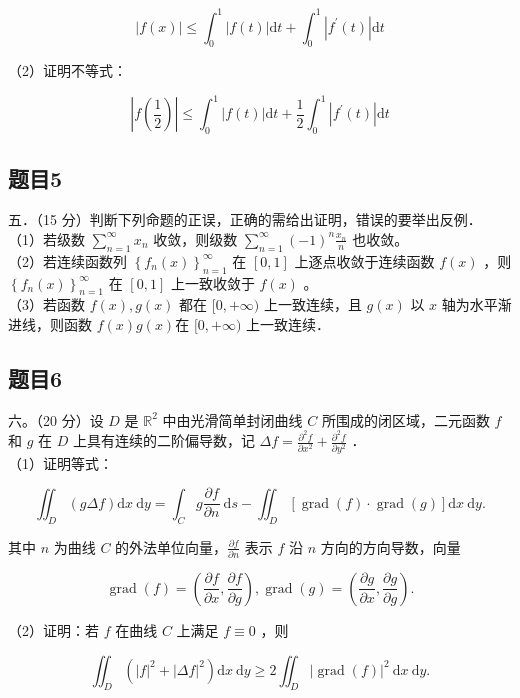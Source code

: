\documentclass{article}
\begin{document}
\[
|f(x)| \leq \int_{0}^{1}|f(t)| \mathrm{d} t+\int_{0}^{1}\left|f^{\prime}(t)\right| \mathrm{d} t
\]

（2）证明不等式：

\[
\left|f\left(\frac{1}{2}\right)\right| \leq \int_{0}^{1}|f(t)| \mathrm{d} t+\frac{1}{2} \int_{0}^{1}\left|f^{\prime}(t)\right| \mathrm{d} t
\]

\subsection{题目5}
五．（15 分）判断下列命题的正误，正确的需给出证明，错误的要举出反例．\\
（1）若级数 \(\sum_{n=1}^{\infty} x_{n}\) 收敛，则级数 \(\sum_{n=1}^{\infty}(-1)^{n} \frac{x_{n}}{n}\) 也收敛。\\
（2）若连续函数列 \(\left\{f_{n}(x)\right\}_{n=1}^{\infty}\) 在 \([0,1]\) 上逐点收敛于连续函数 \(f(x)\) ，则 \(\left\{f_{n}(x)\right\}_{n=1}^{\infty}\) 在 \([0,1]\) 上一致收敛于 \(f(x)\) 。\\
（3）若函数 \(f(x), g(x)\) 都在 \([0,+\infty)\) 上一致连续，且 \(g(x)\) 以 \(x\) 轴为水平渐进线，则函数 \(f(x) g(x)\)在 \([0,+\infty)\) 上一致连续．

\subsection{题目6}
六。（20 分）设 \(D\) 是 \(\mathbb{R}^{2}\) 中由光滑简单封闭曲线 \(C\) 所围成的闭区域，二元函数 \(f\) 和 \(g\) 在 \(D\) 上具有连续的二阶偏导数，记 \(\Delta f=\frac{\partial^{2} f}{\partial x^{2}}+\frac{\partial^{2} f}{\partial y^{2}}\) ．\\
（1）证明等式：

\[
\iint_{D}(g \Delta f) \mathrm{d} x \mathrm{~d} y=\int_{C} g \frac{\partial f}{\partial n} \mathrm{~d} s-\iint_{D}[\operatorname{grad}(f) \cdot \operatorname{grad}(g)] \mathrm{d} x \mathrm{~d} y .
\]

其中 \(n\) 为曲线 \(C\) 的外法单位向量，\(\frac{\partial f}{\partial n}\) 表示 \(f\) 沿 \(n\) 方向的方向导数，向量

\[
\operatorname{grad}(f)=\left(\frac{\partial f}{\partial x}, \frac{\partial f}{\partial g}\right), \operatorname{grad}(g)=\left(\frac{\partial g}{\partial x}, \frac{\partial g}{\partial g}\right) .
\]

（2）证明：若 \(f\) 在曲线 \(C\) 上满足 \(f \equiv 0\) ，则

\[
\iint_{D}\left(|f|^{2}+|\Delta f|^{2}\right) \mathrm{d} x \mathrm{~d} y \geq 2 \iint_{D}|\operatorname{grad}(f)|^{2} \mathrm{~d} x \mathrm{~d} y .
\]
\end{document}

